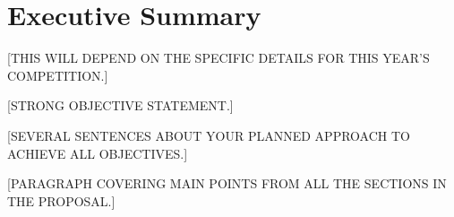 
\section{Executive Summary} %
\label{sec:ExecutiveSummary}

{\color{BYUred}[THIS WILL DEPEND ON THE SPECIFIC DETAILS FOR THIS YEAR'S COMPETITION.]}

{\color{BYUred}[STRONG OBJECTIVE STATEMENT.]}

{\color{BYUred}[SEVERAL SENTENCES ABOUT YOUR PLANNED APPROACH TO ACHIEVE ALL OBJECTIVES.]}
\lipsum[2]

{\color{BYUred}[PARAGRAPH COVERING MAIN POINTS FROM ALL THE SECTIONS IN THE PROPOSAL.]}
\lipsum[2]